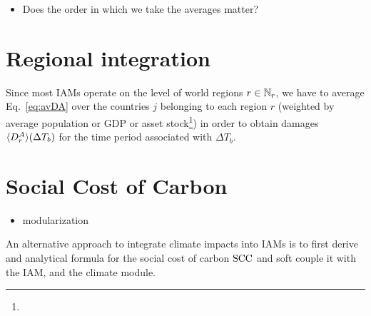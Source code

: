 \documentclass[preprint,3p,authoryear]{elsarticle}
\begin{document}
\begin{itemize}
\item Does the order in which we take the averages matter?
\end{itemize}

\section{Regional integration}
\label{sec:regInt}
Since most IAMs operate on the level of world regions $r\in\mathbb{N}_r$, we have to average Eq.~\eqref{eq:avDA} over the countries $j$ belonging to each region $r$ (weighted by average population or GDP or asset stock\footnote{})  in order to obtain damages $\langle D^A_{r}\rangle(\Delta T_b)$ for the time period associated with $\Delta T_b$.




\section{Social Cost of Carbon}
\label{sec:SCC}

\begin{itemize}
\item modularization
\end{itemize}
An alternative approach to integrate climate impacts into IAMs is to first derive and analytical formula for the social cost of carbon $\operatorname{SCC}$ and soft couple it with the IAM, and the climate module.
\end{document}
